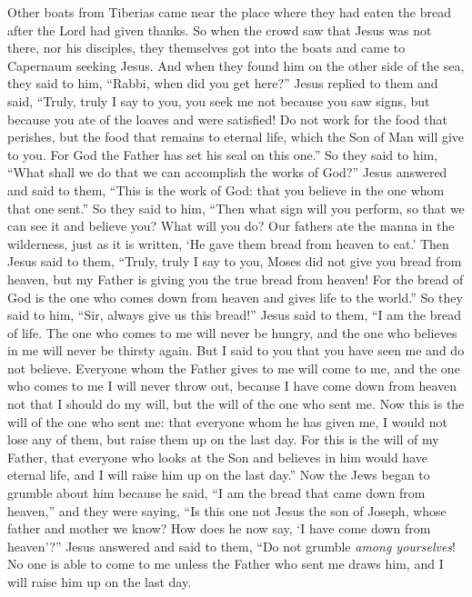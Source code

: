 \begin{biblechapter}
\verse Other boats from Tiberias came near the place where they had eaten the bread after the Lord had given thanks.
\verse So when the crowd saw that Jesus was not there, nor his disciples, they themselves got into the boats and came to Capernaum seeking Jesus.
\verse And when they found him on the other side of the sea, they said to him, “Rabbi, when did you get here?”
\verse Jesus replied to them and said, “Truly, truly I say to you, you seek me not because you saw signs, but because you ate of the loaves and were satisfied!
\verse Do not work for the food that perishes, but the food that remains to eternal life, which the Son of Man will give to you. For God the Father has set his seal on this one.”
\verse So they said to him, “What shall we do that we can accomplish the works of God?”
\verse Jesus answered and said to them, “This is the work of God: that you believe in the one whom that one sent.”
\verse So they said to him, “Then what sign will you perform, so that we can see it and believe you? What will you do?
\verse Our fathers ate the manna in the wilderness, just as it is written, ‘He gave them bread from heaven to eat.’
\verse Then Jesus said to them, “Truly, truly I say to you, Moses did not give you bread from heaven, but my Father is giving you the true bread from heaven!
\verse For the bread of God is the one who comes down from heaven and gives life to the world.”
\verse So they said to him, “Sir, always give us this bread!”
\verse Jesus said to them, “I am the bread of life. The one who comes to me will never be hungry, and the one who believes in me will never be thirsty again.
\verse But I said to you that you have seen me and do not believe.
\verse Everyone whom the Father gives to me will come to me, and the one who comes to me I will never throw out,
\verse because I have come down from heaven not that I should do my will, but the will of the one who sent me.
\verse Now this is the will of the one who sent me: that everyone whom he has given me, I would not lose any of them, but raise them up on the last day.
\verse For this is the will of my Father, that everyone who looks at the Son and believes in him would have eternal life, and I will raise him up on the last day.”
\verse Now the Jews began to grumble about him because he said, “I am the bread that came down from heaven,”
\verse and they were saying, “Is this one not Jesus the son of Joseph, whose father and mother we know? How does he now say, ‘I have come down from heaven’?”
\verse Jesus answered and said to them, “Do not grumble \textit{among yourselves}!
\verse No one is able to come to me unless the Father who sent me draws him, and I will raise him up on the last day.

\end{biblechapter}
